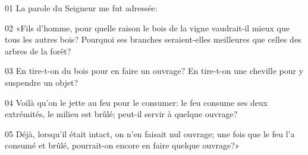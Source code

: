 01 La parole du Seigneur me fut adressée:

02 «Fils d’homme, pour quelle raison le bois de la vigne vaudrait-il mieux que tous les autres bois? Pourquoi ses branches seraient-elles meilleures que celles des arbres de la forêt?

03 En tire-t-on du bois pour en faire un ouvrage? En tire-t-on une cheville pour y suspendre un objet?

04 Voilà qu’on le jette au feu pour le consumer: le feu consume ses deux extrémités, le milieu est brûlé; peut-il servir à quelque ouvrage?

05 Déjà, lorsqu’il était intact, on n’en faisait nul ouvrage; une fois que le feu l’a consumé et brûlé, pourrait-on encore en faire quelque ouvrage?»
